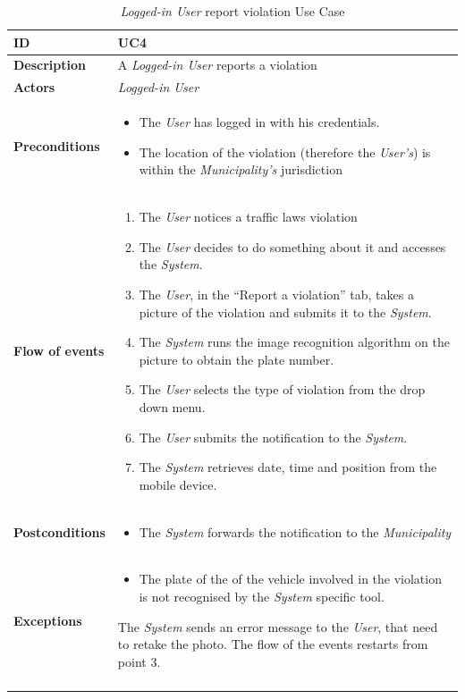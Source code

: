 \documentclass {article}
\begin{document}
	\pagebreak
	\begin{longtable}{| p{3 cm} | p{10.5 cm} |} 
			\hline
			{\bf ID} & UC4 \\
			\hline
			{\bf Description} & A {\it Logged-in User} reports a violation \\
			\hline
			{\bf Actors} & {\it Logged-in User}\\
			\hline
			{\bf Preconditions} & \begin{itemize}
								  \item The {\it User} has logged in with his credentials.
								  \item The location of the violation (therefore the {\it User's}) is within the {\it Municipality's} jurisdiction
								  \end{itemize}	\\
			\hline
			{\bf Flow of events} &	\begin{enumerate}
								  \item The {\it User} notices a traffic laws violation 
								  \item The {\it User} decides to do something about it and accesses the {\it System}.
								  \item The {\it User}, in the “Report a violation” tab, takes a picture of the violation and submits it to the {\it System}.
								  \item The {\it System} runs the image recognition algorithm on the picture to obtain the plate number.
								  \item The {\it User} selects the type of violation from the drop down menu.
								  \item The {\it User} submits the notification to the {\it System}.
								  \item The {\it System} retrieves date, time and position from the mobile device.
								  \end{enumerate}	\\
			\hline
			{\bf Postconditions} & \begin{itemize}
								  \item The {\it System} forwards the notification to the {\it Municipality}
								  \end{itemize}	 \\
			\hline
			{\bf Exceptions} & 	\begin{itemize}
								  \item The plate of the of the vehicle involved in the violation is not recognised by the {\it System} specific tool. 
								  \end{itemize}
								  The {\it System} sends an error message to the {\it User}, that need to retake the photo. The flow of the events restarts from point 3. \\
			\hline
			\caption{{\it Logged-in User} report violation Use Case}
			\end{longtable}
\end{document}
